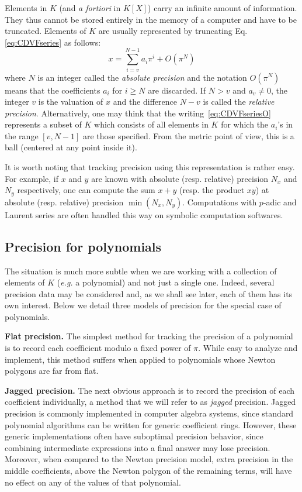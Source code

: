 \documentclass{sig-alternate-05-2015}
\begin{document}
Elements in $K$ (and \emph{a fortiori} in $K[X]$) carry an infinite 
amount of information. They thus cannot be stored entirely in the
memory of a computer and have to be truncated. Elements of $K$ are
usually represented by truncating Eq.\eqref{eq:CDVFseries} as
follows:
\begin{equation}
\label{eq:CDVFseriesO}
x = \sum_{i=v}^{N-1} a_i \pi^i + O(\pi^N)
\end{equation}
where $N$ is an integer called the \emph{absolute precision} and 
the notation $O(\pi^N)$ means that the coefficients $a_i$ for $i
\geq N$ are discarded. If $N > v$ and $a_v \neq 0$, the integer $v$ 
is the valuation of $x$ and the difference $N-v$ is called the
\emph{relative precision}.
Alternatively, one may think that the writing~\eqref{eq:CDVFseriesO}
represents a subset of $K$ which consists of all elements in $K$ for
which the $a_i$'s in the range $[v,N-1]$ are those specified. From the
metric point of view, this is a ball (centered at any point inside it).

It is worth noting that tracking precision using this representation is 
rather easy. For example, if $x$ and $y$ are known with absolute (resp. 
relative) precision $N_x$ and $N_y$ respectively, one can compute the 
sum $x+y$ (resp. the product $xy$) at absolute (resp. relative) 
precision $\min(N_x,N_y)$. Computations with $p$-adic and Laurent
series are often handled this way on symbolic computation softwares.

\subsection{Precision for polynomials}

The situation is much more subtle when we are working with a collection 
of elements of $K$ (\emph{e.g.} a polynomial) and not just a single one.
Indeed, several precision data may be considered and, as we shall see
later, each of them has its own interest. Below we detail three models 
of precision for the special case of polynomials.

\medskip

\noindent
{\bf Flat precision.}
The simplest method for tracking the precision of a polynomial is
to record each coefficient modulo a fixed power of $\pi$.  While
easy to analyze and implement, this method suffers when
applied to polynomials whose Newton polygons are far from flat.

\medskip

\noindent
{\bf Jagged precision.}
The next obvious approach is to record the precision of each
coefficient individually, a method that we will refer to as \emph{jagged}
precision.  Jagged precision is commonly implemented
in computer algebra systems, since standard polynomial algorithms
can be written for generic coefficient rings.  However, these
generic implementations often have suboptimal precision behavior,
since combining intermediate expressions into a final answer
may lose precision.  Moreover, when compared to the Newton
precision model, extra precision in the middle coefficients, above
the Newton polygon of the remaining terms, will have no effect
on any of the values of that polynomial.
\end{document}
